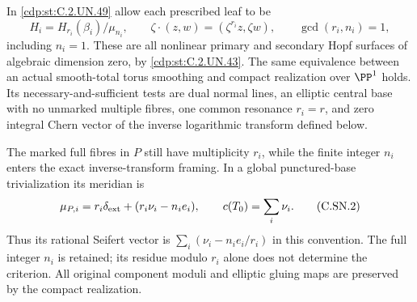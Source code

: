 
\begin{proposition}\label{cdp:st:C.2.UN.50}
In \ref{cdp:st:C.2.UN.49} allow each prescribed leaf to be
\[
 H_i=H_{r_i}(\beta_i)/\mu_{n_i},\qquad
 \zeta\cdot(z,w)=(\zeta^{r_i}z,\zeta w),\qquad
                         \gcd(r_i,n_i)=1,               \tag{C.SN.1}\label{cdp:eq:C.SN.1}
\]
including $n_i=1$. These are all nonlinear primary and
secondary Hopf surfaces of algebraic dimension zero,
by \ref{cdp:st:C.2.UN.43}. The same equivalence between an actual
smooth-total torus smoothing and compact realization
over $\PP^1$ holds. Its necessary-and-sufficient tests
are dual normal lines, an elliptic central base with
no unmarked multiple fibres, one common resonance
$r_i=r$, and zero integral Chern vector of the
inverse logarithmic transform defined below.

The marked full fibres in $P$ still have multiplicity
$r_i$, while the finite integer $n_i$ enters the
exact inverse-transform framing. In a global
punctured-base trivialization its meridian is
\[
       \mu_{P,i}=r_i\delta_{\rm ext}
                         +(r_i\nu_i-n_i e_i),\qquad
                         c(T_0)=\sum_i\nu_i.             \tag{C.SN.2}\label{cdp:eq:C.SN.2}
\]
Thus its rational Seifert vector is
$\sum_i(\nu_i-n_i e_i/r_i)$ in this convention.
The full integer $n_i$ is retained; its residue
modulo $r_i$ alone does not determine the criterion.
All original component moduli and elliptic gluing
maps are preserved by the compact realization.
\end{proposition}

